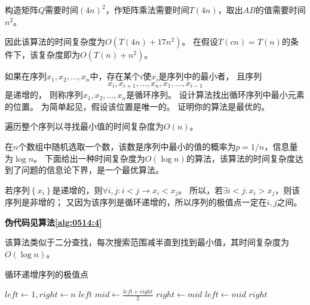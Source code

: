 \begin{questions}
\begin{solution}
        构造矩阵$Q$需要时间$(4n)^2$，作矩阵乘法需要时间$T(4n)$，取出$AB$的值需要时间$n^2$。

        因此该算法的时间复杂度为$O(T(4n) + 17n^2)$。
        在假设$T(cn) = T(n)$的条件下，该复杂度即为$O(T(n)+n^2)$。
    \end{solution}

    \question  如果在序列$x_1,x_2, \dots ,x_n$中，存在某个$i$使$x_i$是序列中的最小者，
    且序列\[ x_i,x_{i+1}, \dots ,x_n,x_1,\dots, x_{i-1} \]是递增的，
    则称序列$x_1,x_2, \dots ,x_n$是循环序列。
    设计算法找出循环序列中最小元素的位置。
    为简单起见，假设该位置是唯一的。
    证明你的算法是最优的。

    \begin{solution}
        遍历整个序列以寻找最小值的时间复杂度为$O(n)$。

        在$n$个数组中随机选取一个数，该数是序列中最小的值的概率为$p = 1 / n$，信息量为$\log n$。
        下面给出一种时间复杂度为$O(\log n)$的算法，该算法的时间复杂度达到了问题的信息论下界，是一个最优算法。

        若序列$\left\{x_i\right\}$是递增的，则$\forall i,j : i < j \rightarrow x_i < x_j$。
        所以，若$\exists i < j : x_i > x_j $，则该序列是非增的；
        又因为该序列是循环递增的，所以序列的极值点一定在$i,j$之间。

        \textbf{伪代码见算法\ref{alg:0514:4}}

        该算法类似于二分查找，每次搜索范围减半直到找到最小值，其时间复杂度为$O(\log n)$。

    \end{solution}

    \begin{algorithm}[!htp]
        \caption{循环递增序列的极值点}\label{alg:0514:4}
        \begin{algorithmic}[1]
            \State $left \gets 1, right \gets n$
                
            \State \Return $left$
            \Else
            \Repeat
            \State $mid \gets \frac{left + right}{2}$
                 
            \State $right \gets mid$
            \Else                           {}
            \State $left \gets mid$
            \EndIf
            \State \Return $right$
            \EndIf
        \end{algorithmic}
    \end{algorithm}

\end{questions}
